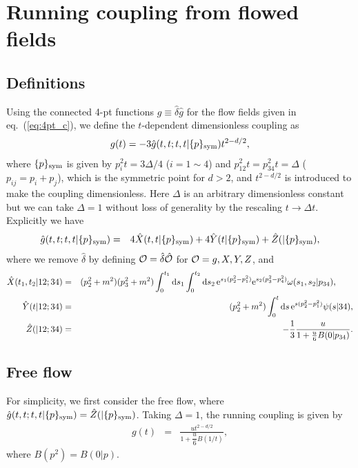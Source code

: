 \documentclass[preprint]{ptephy_v1}%
\newcommand{\rme}{{\rm e}}
\newcommand{\rmd}{{\rm d}}
\begin{document}
\section{Running coupling from flowed fields}
\label{sec:coupling}
\subsection{Definitions}
Using the connected 4-pt functions  $g \equiv \hat \delta \hat g$ for the flow fields given in eq.~(\ref{eq:4pt_c}),
we define the $t$-dependent dimensionless coupling as
\begin{eqnarray}
g(t) = -3 \hat g(t,t; t,t\vert \{ p\}_{\rm sym}) t^{2-d/2},  
\end{eqnarray}
where $\{ p\}_{\rm sym}$ is given by $p_i^2 t = 3\Delta/4$ ($i=1\sim 4$) and $p_{12}^2 t =p_{34}^2 t=\Delta$
($p_{ij}=p_i + p_j$), which is the symmetric point for $d > 2$, and $t^{2-d/2}$ is introduced to make the coupling dimensionless. Here $\Delta$ is an arbitrary dimensionless constant but we can take $\Delta = 1$ without loss of generality by the rescaling $t\rightarrow \Delta t$. 
Explicitly we have
\begin{eqnarray}
\hat  g(t,t; t,t\vert \{ p\}_{\rm sym}) &=& 4 \hat X(t,t\vert  \{ p\}_{\rm sym}) + 4 \hat Y(t\vert  \{ p\}_{\rm sym}) +  \hat Z(\vert \{ p\}_{\rm sym}),
\end{eqnarray}
where we remove $\hat\delta$ by defining ${\cal O} = \hat\delta \hat {\cal O}$ for ${\cal O} = g, X, Y, Z$, and 
\begin{eqnarray}
\hat X(t_1,t_2\vert 12;34) &=& (p_2^2+m^2)(p_3^2+m^2)\int_0^{t_1} \rmd s_1\int_0^{t_2} \rmd s_2\,
\rme^{s_1(p_2^2-p_1^2)}\rme^{s_2(p_3^2-p_4^2)}\omega(s_1,s_2\vert p_{34}),~~~~~~ \\
\hat Y(t\vert 12;34) &=& (p_2^2+m^2) \int_0^t \rmd s\, \rme^{s(p_2^2-p_1^2)}\psi(s\vert  34), \\
\hat Z(\vert 12;34) &=& -\frac{1}{3}\frac{u}{1+\frac{u}{6} B(0\vert p_{34})} .
\end{eqnarray}
 

\subsection{Free flow}
For simplicity, we first consider the free flow, where $\hat g(t,t;t,t\vert \{p\}_{\rm sym}) =  \hat Z( \vert \{ p\}_{\rm sym})$.
Taking $\Delta=1$,   the running coupling is given by
\begin{eqnarray}
g(t) &=& \frac{u t^{2-d/2}}{1+\dfrac{u}{6} B\left(1/t\right)},
\end{eqnarray}
where $B(p^2) = B(0\vert p)$.
\end{document}
